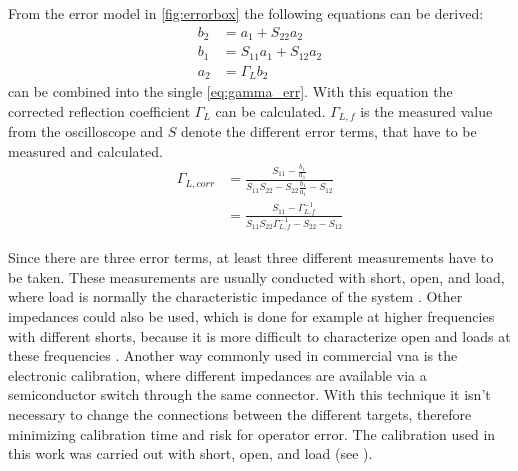 \documentclass[12pt,a4paper,parskip=full,abstract=true,BCOR=10mm,twoside,open=right]{scrreprt}
\begin{document}
From the error model in \cref{fig:errorbox} the following equations can be derived:
\begin{align}
    \label{eq:b2} b_{2} & = a_{1} + S_{22} a_{2}\\
    \label{eq:b1} b_{1} & = S_{11} a_{1} + S_{12} a_{2} \\
    \label{eq:a2} a_{2} & = \Gamma_L b_{2}
\end{align}
 can be combined into the single \cref{eq:gamma_err}.
With this equation the corrected reflection coefficient $\Gamma_L$ can be calculated.
$\Gamma_{L,f}$ is the measured value from the oscilloscope and $S$ denote the different
error terms, that have to be measured and calculated.
\begin{equation}\label{eq:gamma_err}
    \begin{split}
        \Gamma_{L,corr} & = \frac{S_{11} - \frac{b_1}{a_1}}{S_{11} S_{22} - S_{22}\frac{b_1}{a_1} - S_{12}} \\
                        & = \frac{S_{11} - \Gamma_{L,f}^{-1}}{S_{11} S_{22}\Gamma_{L,f}^{-1} - S_{22} - S_{12}}
    \end{split}
\end{equation}

Since there are three error terms, at least three different measurements have
to be taken. These measurements are usually conducted with short, open, and load,
where load is normally the characteristic impedance of the system \cite{agilent_an_1287-3}.
Other impedances could also be used, which is done for example at higher frequencies
with different shorts, because it is more difficult to characterize open and
loads at these frequencies \cite{anritsu_cal}. Another way commonly used in
commercial \gls{vna} is the electronic calibration, where different impedances
are available via a semiconductor switch through the same connector. With this
technique it isn't necessary to change the connections between the different
targets, therefore minimizing calibration time and risk for operator error.
The calibration used in this work was carried out with short, open, and load (see
).
\end{document}
